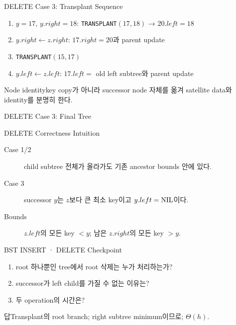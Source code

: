 \begin{frame}{DELETE Case 3: Transplant Sequence}
\small\begin{enumerate}
\item $y=17$, $y.right=18$: \texttt{TRANSPLANT}$(17,18)$ → $20.left=18$
\item $y.right\gets z.right$: $17.right=20$과 parent update
\item \texttt{TRANSPLANT}$(15,17)$
\item $y.left\gets z.left$: $17.left=$ old left subtree와 parent update
\end{enumerate}
\begin{block}{Node identity}key copy가 아니라 successor node 자체를 옮겨 satellite data와 identity를 분명히 한다.\end{block}
\end{frame}
\begin{frame}{DELETE Case 3: Final Tree}
\centering{}
\end{frame}
\begin{frame}{DELETE Correctness Intuition}
\begin{description}
\item[Case 1/2] child subtree 전체가 올라가도 기존 ancestor bounds 안에 있다.
\item[Case 3] successor $y$는 $z$보다 큰 최소 key이고 $y.left=\mathrm{NIL}$이다.
\item[Bounds] $z.left$의 모든 key $<y$; 남은 $z.right$의 모든 key $>y$.
\end{description}
\end{frame}
\begin{frame}{BST INSERT · DELETE Checkpoint}
\begin{enumerate}\item root 하나뿐인 tree에서 root 삭제는 누가 처리하는가?\item successor가 left child를 가질 수 없는 이유는?\item 두 operation의 시간은?\end{enumerate}
\begin{exampleblock}{답}Transplant의 root branch; right subtree minimum이므로; $\Theta(h)$.\end{exampleblock}
\end{frame}
